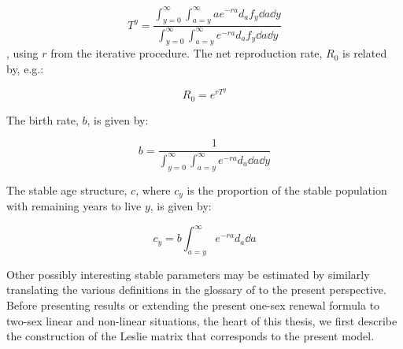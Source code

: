 \begin{equation}
 T^y =  \frac{\int _{y=0}^\infty \int _{a=y}^\infty a e^{-ra} d_a f_y \dd a
\dd y}{\int _{y=0}^\infty \int _{a=y}^\infty e^{-ra} d_a f_y \dd a \dd y}
\end{equation}
, using $r$ from the iterative procedure. The net reproduction rate, $R_0$ is
related by, e.g.:

\begin{equation}
R_0 = e^{r T^y}
\end{equation}

The birth rate, $b$, is given by:

\begin{equation}
b = \frac{1}{\int _{y=0}^\infty \int _{a=y}^\infty e^{-ra} d_a \dd a
\dd y}
\end{equation}

The stable age structure, $c$, where $c_y$ is the
proportion of the stable population with remaining years to live $y$, is given
by:

\begin{equation}
c_y = b \int _{a=y}^\infty e^{-ra} d_a \dd a
\end{equation}

Other possibly interesting stable parameters may be estimated by
similarly translating the various definitions in the glossary of
\citet{coale1972growth} to the present perspective. Before presenting 
results or extending the present one-sex renewal
formula to two-sex linear and non-linear situations, the heart of this 
thesis, we first describe the construction of the Leslie matrix that corresponds to the
present model.
